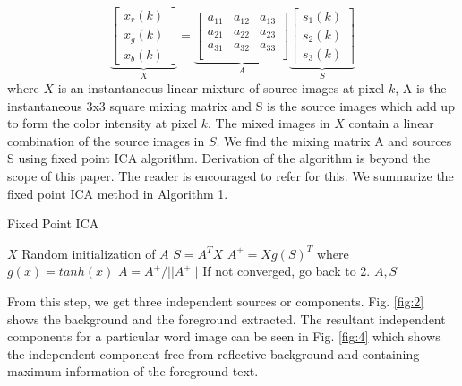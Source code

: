 \begin{equation}
\underbrace{\left[ {\begin{array}{c}
{x_r(k)} \\
{x_g(k)} \\
{x_b(k)}
 \end{array} } \right]}_{X}
=
\underbrace{\left[ {\begin{array}{ccc}
a_{11} & a_{12} & a_{13} \\
a_{21} & a_{22} & a_{23} \\
a_{31} & a_{32} & a_{33} \\
 \end{array} } \right]}_{A}
\underbrace{\left[ {\begin{array}{c}
s_1(k)\\s_2(k)\\ s_3(k)
 \end{array} } \right]}_{S}
\end{equation} where $X$ is an instantaneous linear mixture of source
images at pixel $k$, A is the instantaneous $3$x$3$ square mixing matrix and S
is the source images which add up to form the color intensity 
at pixel $k$.  
The mixed images
in $X$ contain a linear combination of the source
images in $S$. We find the mixing matrix A and sources S using fixed point ICA
algorithm.
Derivation of the algorithm is beyond the scope of this paper.
The reader is encouraged to refer \cite{A11} for this. We summarize the 
fixed point ICA method in Algorithm 1.

\begin{algorithm}[t]
\caption{Fixed Point ICA}
\begin{algorithmic}[1] 
\REQUIRE $X$
\STATE Random initialization of $A$
\STATE $S=A^TX$
\STATE $A^+=Xg(S)^T$
where $g(x)=tanh(x)$ 
\STATE $A=A^+/||A^+||$  
\STATE If not converged, go back to 2.
\ENSURE $A,S$ 
\end{algorithmic}
\end{algorithm} 
From this step, we get three independent sources or components.
Fig. \ref{fig:2} shows the background and the foreground extracted.
The resultant independent components for a particular word image can be seen in 
Fig. \ref{fig:4} which shows the independent component free from reflective background 
and containing maximum information of the foreground text.

